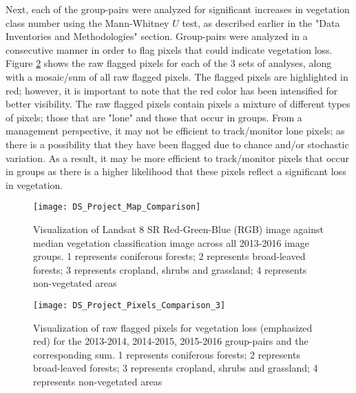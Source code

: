 \justify
Next, each of the group-pairs were analyzed for significant increases in vegetation class number using the Mann-Whitney $U$ test, as described earlier in the "Data Inventories and Methodologies" section. Group-pairs were analyzed in a consecutive manner in order to flag pixels that could indicate vegetation loss. Figure \ref{fig23} shows the raw flagged pixels for each of the 3 sets of analyses, along with a mosaic/sum of all raw flagged pixels. The flagged pixels are highlighted in red; however, it is important to note that the red color has been intensified for better visibility. The raw flagged pixels contain pixels a mixture of different types of pixels; those that are "lone" and those that occur in groups. From a management perspective, it may not be efficient to track/monitor lone pixels; as there is a possibility that they have been flagged due to chance and/or stochastic variation. As a result, it may be more efficient to track/monitor pixels that occur in groups as there is a higher likelihood that these pixels reflect a significant loss in vegetation.

\begin{figure}[H]
	\centering
	\texttt{[image: DS\_Project\_Map\_Comparison]}
	\caption[Visualization of Landsat 8 SR Red-Green-Blue (RGB) image against median vegetation classification image across all 2013-2016 image groups]{Visualization of Landsat 8 SR Red-Green-Blue (RGB) image against median vegetation classification image across all 2013-2016 image groups. 1 represents coniferous forests; 2 represents broad-leaved forests; 3 represents cropland, shrubs and grassland; 4 represents non-vegetated areas}
	\label{fig22}
\end{figure}

\begin{figure}[H]
	\centering
	\texttt{[image: DS\_Project\_Pixels\_Comparison\_3]}
	\caption[Visualization of raw flagged pixels for vegetation loss (emphasized red) for the 2013-2014, 2014-2015, 2015-2016 group-pairs and the corresponding sum]{Visualization of raw flagged pixels for vegetation loss (emphasized red) for the 2013-2014, 2014-2015, 2015-2016 group-pairs and the corresponding sum. 1 represents coniferous forests; 2 represents broad-leaved forests; 3 represents cropland, shrubs and grassland; 4 represents non-vegetated areas}
	\label{fig23}
\end{figure}

